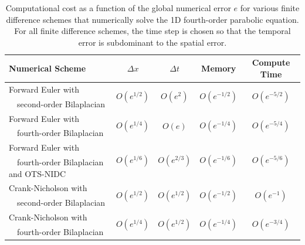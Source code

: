 \documentclass[fleqn,12pt,twoside]{article}
\def\dt{\Delta t}
\def\dx{\Delta x}
\begin{document}
\begin{table}[tb]
\caption{
Computational cost as a function of the global numerical error $e$
for various finite difference schemes that numerically solve the 1D 
fourth-order parabolic equation.  For all finite difference schemes, the 
time step is chosen so that the temporal error is subdominant to the spatial
error.
}
\label{tab:comp_perf_vs_err_4th_order_parabolic} 
\renewcommand{\arraystretch}{1.3}
\centering
\begin{tabular}{lcccc}
  \hline
  {\bf Numerical Scheme} & $\dx$ 
  & $\dt$
  & {\bf Memory}
  & {\bf Compute Time}
  \\
  \hline 
  Forward Euler with 
    & \multirow{2}{*}{$O\left( e^{1/2} \right)$} 
    & \multirow{2}{*}{$O\left( e^{2} \right)$}
    & \multirow{2}{*}{$O\left( e^{-1/2} \right)$} 
    & \multirow{2}{*}{$O\left( e^{-5/2} \right)$} \\
  \ \ second-order Bilaplacian & & & & \\
  Forward Euler with 
    & \multirow{2}{*}{$O\left( e^{1/4} \right)$}
    & \multirow{2}{*}{$O\left( e \right)$}
    & \multirow{2}{*}{$O\left( e^{-1/4} \right)$} 
    & \multirow{2}{*}{$O\left( e^{-{5/4}} \right)$} \\
  \ \ fourth-order Bilaplacian & & & & \\
  Forward Euler with 
    & \multirow{2}{*}{$O\left( e^{1/6} \right)$} 
    & \multirow{2}{*}{$O\left( e^{2/3} \right)$} 
    & \multirow{2}{*}{$O\left( e^{-1/6} \right)$} 
    & \multirow{2}{*}{$O\left( e^{-5/6} \right)$} \\ 
  \ \ fourth-order Bilaplacian and OTS-NIDC & & & & \\
  Crank-Nicholson with 
    & \multirow{2}{*}{$O\left( e^{1/2} \right)$} 
    & \multirow{2}{*}{$O\left( e^{1/2} \right)$} 
    & \multirow{2}{*}{$O\left( e^{-1/2} \right)$} 
    & \multirow{2}{*}{$O\left( e^{-1} \right)$} \\
  \ \ second-order Bilaplacian & & & & \\
  Crank-Nicholson with 
    & \multirow{2}{*}{$O\left( e^{1/4} \right)$} 
    & \multirow{2}{*}{$O\left( e^{1/2} \right)$} 
    & \multirow{2}{*}{$O\left( e^{-1/4} \right)$} 
    & \multirow{2}{*}{$O\left( e^{-3/4} \right)$} \\
  \ \ fourth-order Bilaplacian & & & & \\
  \hline
\end{tabular}
\end{table}
\end{document}
